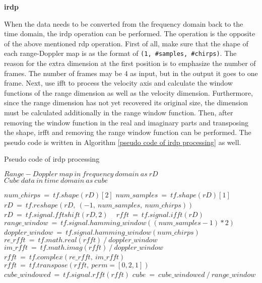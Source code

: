 \begin{spacing}{1.5}
\textbf{\large{\gls{irdp}}}
\end{spacing}

When the data needs to be converted from the frequency domain back to the time domain, the \gls{irdp} operation can be performed. The operation is the opposite of the above mentioned \gls{rdp} operation. First of all, make sure that the shape of each range-Doppler map is as the format of \texttt{(1, \#samples, \#chirps)}. The reason for the extra dimension at the first position is to emphasize the number of frames. The number of frames may be 4 as input, but in the output it goes to one frame. Next, use \gls{ifft} to process the velocity axis and calculate the window functions of the range dimension as well as the velocity dimension. Furthermore, since the range dimension has not yet recovered its original size, the dimension must be calculated additionally in the range window function. Then, after removing the window function in the real and imaginary parts and transposing the shape, \gls{irfft} and removing the range window function can be performed. The pseudo code is written in Algorithm \ref{pseudo code of irdp processing} as well.

\begin{algorithm}
    \caption{Pseudo code of \gls{irdp} processing}
    \label{pseudo code of irdp processing}
    \renewcommand{\algorithmicrequire}{\textbf{Input:}}
    \renewcommand{\algorithmicensure}{\textbf{Output:}}
    
    \begin{algorithmic}[1]
        \REQUIRE $Range-Doppler\ map\ in\ frequency\ domain\ as\ rD$
        \ENSURE $Cube\ data\ in\ time\ domain\ as\ cube$

        \STATE $num\_chirps\ =\ tf.shape(rD)[2]$
        \STATE $num\_samples\ =\ tf.shape(rD)[1]$
        \STATE $rD\ =\ tf.reshape(rD,\ (-1,\ num\_samples,\ num\_chirps))$
        \STATE ~
            \STATE $rD\ =\ tf.signal.fftshift(rD, 2)$
        \ENDIF
        \STATE ~
        \STATE $rfft\ =\ tf.signal.ifft(rD)$
        \STATE $range\_window\ =\ tf.signal.hamming\_window((num\_samples-1)*2)$
        \STATE $doppler\_window\ =\ tf.signal.hamming\_window(num\_chirps)$
        \STATE ~
        \STATE $re\_rfft\ =\ tf.math.real(rfft)\ /\ doppler\_window$
        \STATE $im\_rfft\ =\ tf.math.imag(rfft)\ /\ doppler\_window$
        \STATE $rfft\ =\ tf.complex(re\_rfft,\ im\_rfft)$
        \STATE ~
        \STATE $rfft\ =\ tf.transpose(rfft,\ perm=[0, 2, 1])$
        \STATE $cube\_windowed\ =\ tf.signal.rfft(rfft)$
        \STATE $cube\ =\ cube\_windowed\ /\ range\_window$
        
    \end{algorithmic}
\end{algorithm}

